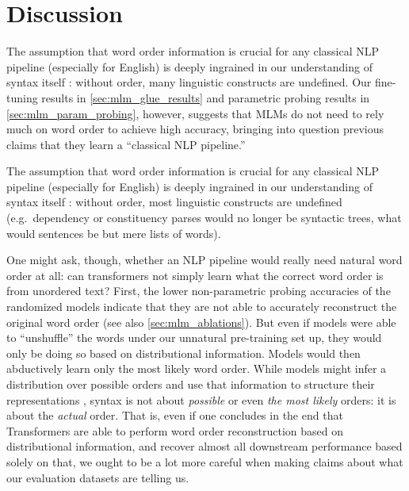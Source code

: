 \documentclass[letterpaper, 12pt]{report}
\begin{document}
\section{Discussion}
\label{sec:mlm_discussion}

The assumption that word order information is crucial for any classical NLP pipeline (especially for English) is deeply ingrained in our understanding of syntax itself \citep{chomsky1957syntactic}: without order, many linguistic constructs are undefined. %
Our fine-tuning results in \autoref{sec:mlm_glue_results} and parametric probing results in \autoref{sec:mlm_param_probing}, however, suggests that MLMs do not need to rely much on word order to achieve high accuracy, bringing into question previous claims that they learn a ``classical NLP pipeline.''

The assumption that word order information is crucial for any classical NLP pipeline (especially for English) is deeply ingrained in our understanding of syntax itself \citep{chomsky1957syntactic}: without order, most linguistic constructs are undefined (e.g.\ dependency or constituency parses would no longer be syntactic trees, what would sentences be but mere lists of words).

One might ask, though, whether an NLP pipeline would really need natural word order at all: can transformers not simply learn what the correct word order is from unordered text?
First, the lower non-parametric probing accuracies of the randomized models indicate that they are not able to accurately reconstruct the original word order (see also \autoref{sec:mlm_ablations}).
But even if models were able to ``unshuffle'' the words under our unnatural pre-training set up, they would only be doing so based on distributional information.
Models would then abductively learn only the most likely word order. %
While models might infer a distribution over possible orders and use that information to structure their representations \citep{papadimitriou-etal-2021-deep}, syntax is not about \emph{possible} or even  \emph{the most likely} orders: it is about the \emph{actual} order. That is, even if one concludes in the end that Transformers are able to perform word order reconstruction based on distributional information, and recover almost all downstream performance based solely on that, we ought to be a lot more careful when making claims about what our evaluation datasets are telling us.
\end{document}
